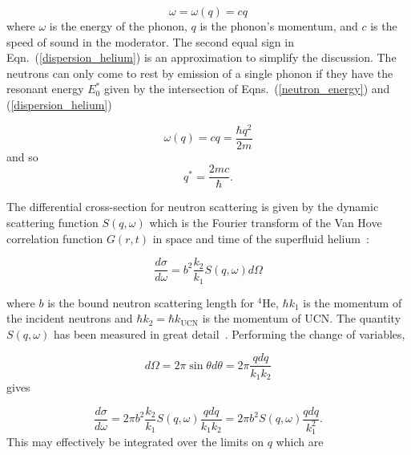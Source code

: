 \begin{equation}
\label{dispersion_helium}
\omega=\omega(q)= cq
\end{equation}
where $\omega$ is the energy of the phonon, $q$ is the phonon's
momentum, and $c$ is the speed of sound in the moderator. The second
equal sign in Eqn.~(\ref{dispersion_helium}) is an approximation to
simplify the discussion.  The neutrons can only come to rest by
emission of a single phonon if they have the resonant energy $E_0^*$
given by the intersection of Eqns.~(\ref{neutron_energy}) and
(\ref{dispersion_helium})

\begin{equation}
\omega(q)=cq=\frac{\hbar q^2}{2m}
\end{equation}
and so
\begin{equation}
q^*=\frac{2mc}{\hbar}.
\end{equation}


The differential cross-section for neutron scattering is given by the
dynamic scattering function $S(q,\omega)$ which is the Fourier
transform of the Van Hove correlation function $G(r,t)$ in space and
time of the superfluid helium~\cite{Squires}:

\begin{equation}
\frac{d\sigma}{d\omega}=b^2 \frac{k_2}{k_1}S(q,\omega) d\Omega
\end{equation}

where $b$ is the bound neutron scattering length for $^4$He, $\hbar
k_1$ is the momentum of the incident neutrons and $\hbar k_2=\hbar
k_{\text{UCN}}$ is the momentum of UCN. The quantity $S(q,\omega)$ has
been measured in great
detail~\cite{S_func1,S_func2,S_func3}. Performing the
change of variables,

\begin{equation}
d\Omega=2 \pi \sin \theta d \theta = 2 \pi \frac{q dq}{k_1 k_2}
\end{equation}
gives

\begin{equation}
 \frac{d\sigma}{d\omega}=2\pi b^2 \frac{k_2}{k_1}S(q,\omega)\frac{q
   dq}{k_1 k_2}=2\pi b^2 S(q,\omega)\frac{q dq}{k_1^2}.
\end{equation}
This may effectively be integrated over the limits on $q$ which are

